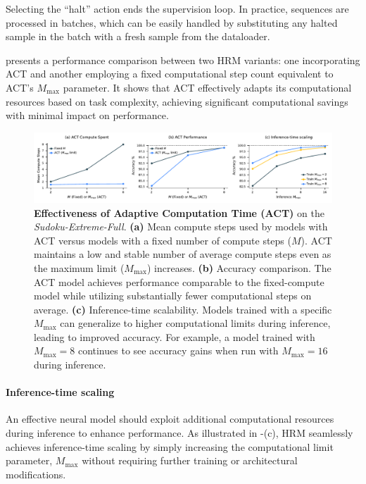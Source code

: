 Selecting the ``halt'' action ends the supervision loop. In practice, sequences are processed in batches, which can be easily handled by substituting any halted sample in the batch with a fresh sample from the dataloader.

 presents a performance comparison between two HRM variants: one incorporating ACT and another employing a fixed computational step count equivalent to ACT's $M_{\max}$ parameter. It shows that ACT effectively adapts its computational resources based on task complexity, achieving significant computational savings with minimal impact on performance.

\begin{figure}[t!]
\centering
\includegraphics[width=\linewidth]{figures/act/act.pdf} 
\caption{\textbf{Effectiveness of Adaptive Computation Time (ACT)} on the \textit{Sudoku-Extreme-Full}.
\textbf{(a)} Mean compute steps used by models with ACT versus models with a fixed number of compute steps ($M$). ACT maintains a low and stable number of average compute steps even as the maximum limit ($M_{\max}$) increases.
\textbf{(b)} Accuracy comparison. The ACT model achieves performance comparable to the fixed-compute model while utilizing substantially fewer computational steps on average.
\textbf{(c)} Inference-time scalability. Models trained with a specific $M_{\max}$ can generalize to higher computational limits during inference, leading to improved accuracy. For example, a model trained with $M_{\max}=8$ continues to see accuracy gains when run with $M_{\max}=16$ during inference.}
\label{fig:act}
\end{figure}

\paragraph{Inference-time scaling}
An effective neural model should exploit additional computational resources during inference to enhance performance. As illustrated in -(c), HRM seamlessly achieves inference-time scaling by simply increasing the computational limit parameter, $M_{\max}$ without requiring further training or architectural modifications.

